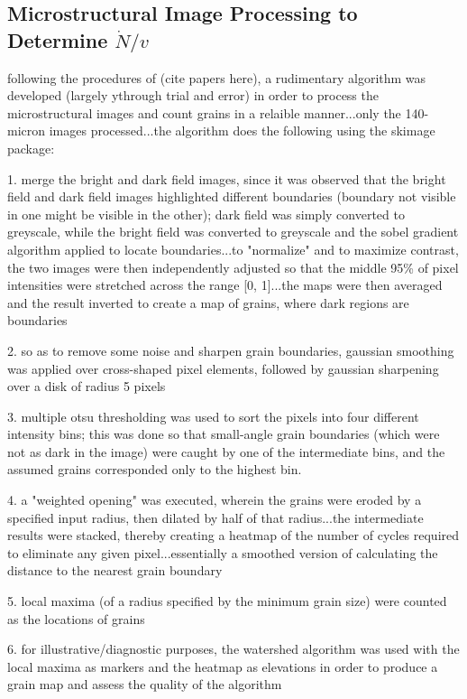 \subsection{Microstructural Image Processing to Determine $\dot{N}/v$}

following the procedures of (cite papers here), a rudimentary algorithm was developed (largely ythrough trial and error) in order to process the microstructural images and count grains in a relaible manner...only the 140-micron images processed...the algorithm does the following using the skimage package:

1. merge the bright and dark field images, since it was observed that the bright field and dark field images highlighted different boundaries (boundary not visible in one might be visible in the other); dark field was simply converted to greyscale, while the bright field was converted to greyscale and the sobel gradient algorithm applied to locate boundaries...to "normalize" and to maximize contrast, the two images were then independently adjusted so that the middle 95\% of pixel intensities were stretched across the range [0, 1]...the maps were then averaged and the result inverted to create a map of grains, where dark regions are boundaries

2. so as to remove some noise and sharpen grain boundaries, gaussian smoothing was applied over cross-shaped pixel elements, followed by gaussian sharpening over a disk of radius 5 pixels

3. multiple otsu thresholding was used to sort the pixels into four different intensity bins; this was done so that small-angle grain boundaries (which were not as dark in the image) were caught by one of the intermediate bins, and the assumed grains corresponded only to the highest bin.

4. a "weighted opening" was executed, wherein the grains were eroded by a specified input radius, then dilated by half of that radius...the intermediate results were stacked, thereby creating a heatmap of the number of cycles required to eliminate any given pixel...essentially a smoothed version of calculating the distance to the nearest grain boundary

5. local maxima (of a radius specified by the minimum grain size) were counted as the locations of grains

6. for illustrative/diagnostic purposes, the watershed algorithm was used with the local maxima as markers and the heatmap as elevations in order to produce a grain map and assess the quality of the algorithm

